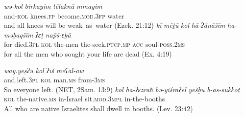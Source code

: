 \documentclass[output=paper]{langsci/langscibook}
\begin{document}
\ea%
    \label{ex:doron:19}
    \ea
    \gll \textit{wə-ḵol}     \textit{birkayim}   \textit{tēlaḵnā}                  \textit{mmayim}\\
         and-\textsc{kol}  knees.\textsc{fp}   become\textsc{.mod.3fp}   water\\
    \glt and all knees will be weak~as~water (Ezek. 21:12)
    \ex  
    \gll \textit{kī}   \textit{mēṯū}        \textit{kol}    \textit{hā-ʔănāšīm}   \textit{ha-məḇaqšīm}         \textit{ʔɛṯ}    \textit{na\={p}š-ɛḵā}\\
         for died.\textsc{3pl}   \textsc{kol}  the-men        the-seek.\textsc{ptcp.mp}  \textsc{acc}  soul-\textsc{poss.2ms}\\
    \glt for all the men who sought your life are dead (Ex. 4:19)
    \z
\z


\ea%
    \label{ex:doron:20}
    \ea
    \gll \textit{way.yēṣʔū}      \textit{kol}   \textit{ʔīš}            \textit{mēʕāl-āw}\\
         and.left\textsc{.3pl}   \textsc{kol}  man.\textsc{ms}  from-\textsc{3ms}\\
    \glt So everyone left. (NET, 2Sam. 13:9)
    \ex  
    \gll \textit{kol}    \textit{hā-ʔɛzrāħ}         \textit{bə-yiśrāʔēl}  \textit{yēšḇū}                \textit{b-as-sukkōṯ}\\
         \textsc{kol}  the-native\textsc{.ms}  in-Israel       sit.\textsc{mod.3mpl}  in-the-booths\\
    \glt All who are native Israelites shall dwell in booths. (Lev. 23:42)
    \z
\z
\end{document}
